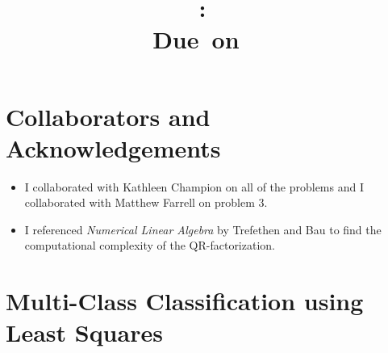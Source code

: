 \documentclass{article}
\title{
    \vspace{2in}
    \textmd{\textbf{\hmwkClass:\ \hmwkTitle}}\\
    \normalsize\vspace{0.1in}\small{Due\ on\ \hmwkDueDate\ }\\
    \vspace{3in}
}
\author{\textbf{\hmwkAuthorName}}
\date{}
\begin{document}
\maketitle

\pagebreak

\section{Collaborators and Acknowledgements}
\begin{itemize}
	\item I collaborated with Kathleen Champion on all of the problems and I collaborated with Matthew Farrell on problem 3.
	\item I referenced \textit{Numerical Linear Algebra} by Trefethen and Bau to find the computational complexity of the QR-factorization.
\end{itemize}

\section{Multi-Class Classification using Least Squares}
\end{document}
